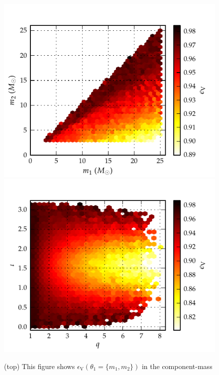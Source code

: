 \begin{figure}
\centering
\includegraphics[keepaspectratio=true, scale=0.04, clip=false, height=0.45\textheight]{figures/eobpnmetric/EOBHMvsEOB22VeffLossm1m2-PRD.pdf} %
\includegraphics[keepaspectratio=true, scale=0.04, clip=false, height=0.45\textheight]{figures/eobpnmetric/EOBHMvsEOB22VeffLossqinc-PRD.pdf} %
\caption{\label{fig:VeffLoss_eob22eobhm} (top) This figure shows $\epsilon_{\mathrm{V}}\left(\theta_1=\{m_1,m_2\}\right)$ in the component-mass
}
\end{figure}
